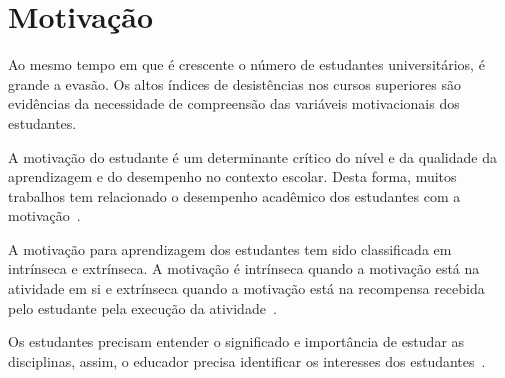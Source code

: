 \section{Motivação}
\label{sec-revisao-motivacao}
Ao mesmo tempo em que é crescente o número
de estudantes universitários, é grande a
evasão.
Os altos índices de desistências nos cursos
superiores são evidências da necessidade de
compreensão das variáveis motivacionais
dos estudantes.

A motivação do estudante é um determinante crítico 
do  nível  e  da  qualidade  da  aprendizagem
e do desempenho no contexto
escolar.
Desta forma, muitos trabalhos tem relacionado o desempenho
acadêmico dos estudantes com
a motivação~\cite{zenorini2011motivaccao,rufini2011estudo}.

A motivação para aprendizagem dos estudantes
tem sido classificada em intrínseca e
extrínseca.
A motivação é intrínseca quando a motivação
está na atividade em si e extrínseca quando
a motivação está na recompensa recebida pelo estudante
pela execução da
atividade~\cite{rufini2011estudo,neves2007escala}.

Os estudantes precisam entender o significado e importância
de estudar as disciplinas, assim, o educador
precisa identificar os interesses
dos estudantes~\cite{angeli2011relaccao}.
